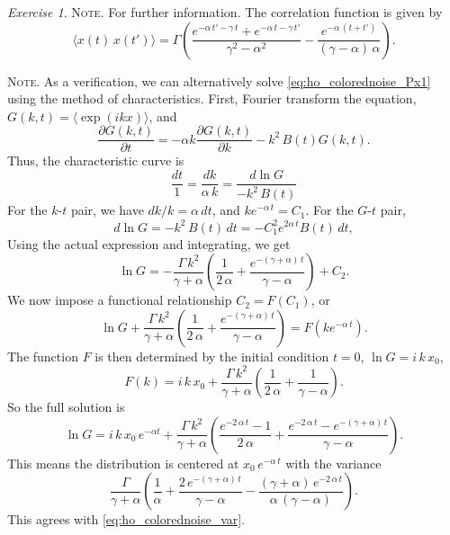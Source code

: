 \documentclass{book}
\numberwithin{equation}{section}
\theoremstyle{plain}
\theoremstyle{definition}
\theoremstyle{remark}
\theoremstyle{BoldStyle}
\newtheorem{exercise}{Exercise}
\numberwithin{exercise}{section}
\newcommand{\note}[1]{{\color{DarkGreen}\footnotesize \textsc{Note.} #1}}
\begin{document}
\begin{exercise}
  \note{
    For further information.
    The correlation function is given by
    $$
    \langle x(t) \, x(t') \rangle
    =
    \Gamma \left(
      \frac{ e^{-\alpha \, t' - \gamma \, t} + e^{-\alpha \, t - \gamma \, t' }  }
      { \gamma^2 - \alpha^2 }
      -
      \frac{ e^{ -\alpha \, (t + t') } } { (\gamma - \alpha) \, \alpha }
    \right).
    $$
  }

  \note{
    As a verification,
    we can alternatively solve \eqref{eq:ho_colorednoise_Px1} using
    the method of characteristics.
    First, Fourier transform the equation,
    $G(k,t) = \langle \exp(ikx) \rangle$,
    and
    $$
    \frac{ \partial G(k, t) } { \partial t }
    =
    -\alpha k \frac{ \partial G(k, t) } { \partial k }
    - k^2 \, B(t) G(k, t).
    $$
    Thus, the characteristic curve is
    $$
    \frac{ dt } { 1 }
    =
    \frac{ dk } { \alpha \, k }
    =
    \frac{ d\ln G } { -k^2 \, B(t) }
    $$
    For the $k$-$t$ pair, we have $dk/k = \alpha \, dt$,
    and $k e^{-\alpha \, t} = C_1$.
    For the $G$-$t$ pair,
    $$
    d\ln G = -k^2 \, B(t) \, dt = -C_1^2 e^{2\alpha\, t} B(t) \, dt,
    $$
    Using the actual expression and integrating, we get
    $$
    \ln G = -\frac{\Gamma \, k^2 }{ \gamma + \alpha }
    \left( \frac{1}{2 \, \alpha} + \frac{e^{-(\gamma + \alpha) \,t }}{\gamma - \alpha} \right)
    + C_2.
    $$
    We now impose a functional relationship $C_2 = F(C_1)$, or
    $$
    \ln G + \frac{\Gamma \, k^2 }{ \gamma + \alpha }
    \left( \frac{1}{2 \, \alpha} + \frac{e^{-(\gamma + \alpha) \,t }}{\gamma - \alpha} \right)
    = F(ke^{-\alpha \, t}).
    $$
    The function $F$ is then determined by the initial condition $t = 0$,
    $\ln G = i \, k \, x_0$,
    $$
    F(k) = i \, k \, x_0 + \frac{\Gamma \, k^2 }{ \gamma + \alpha }
    \left( \frac{1}{2 \, \alpha} + \frac{1}{\gamma - \alpha} \right).
    $$
    So the full solution is
    $$
    \ln G = i \, k \, x_0 \, e^{-\alpha t} + \frac{\Gamma \, k^2 }{ \gamma + \alpha }
    \left( \frac{e^{-2 \, \alpha \, t} - 1}{2 \, \alpha}
    + \frac{e^{-2 \, \alpha \, t} - e^{-(\gamma + \alpha) \, t} }{\gamma - \alpha} \right).
    $$
    This means the distribution is centered at $x_0 \, e^{-\alpha \, t}$
    with the variance
    $$
    \frac{\Gamma }{ \gamma + \alpha }
    \left( \frac{1}{\alpha}
    + \frac{ 2 \, e^{-(\gamma + \alpha) \, t} }{\gamma - \alpha}
    - \frac{ (\gamma + \alpha) \, e^{-2\, \alpha \, t} }{\alpha \, (\gamma - \alpha)} \right).
    $$
    This agrees with \eqref{eq:ho_colorednoise_var}.
  }

\end{exercise}
\end{document}
